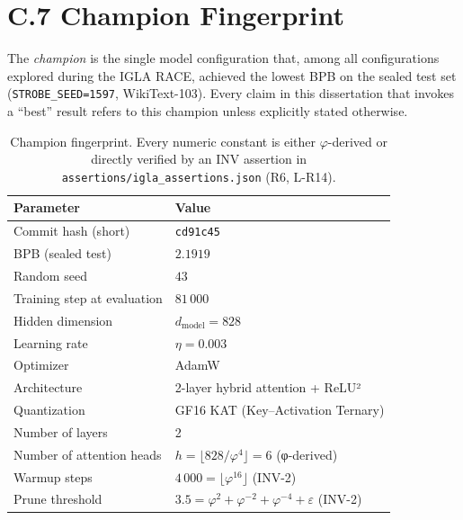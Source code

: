 \section*{C.7 Champion Fingerprint}
\label{sec:champion-fingerprint}

The \emph{champion} is the single model configuration that, among all
configurations explored during the IGLA RACE, achieved the lowest
BPB on the sealed test set (\texttt{STROBE\_SEED=1597}, WikiText-103).
Every claim in this dissertation that invokes a ``best'' result refers
to this champion unless explicitly stated otherwise.

\begin{table}[h]
\centering
\begin{tabular}{ll}
\toprule
\textbf{Parameter} & \textbf{Value} \\
\midrule
Commit hash (short)        & \texttt{cd91c45} \\
BPB (sealed test)          & $2.1919$ \\
Random seed                & $43$ \\
Training step at evaluation& $81\,000$ \\
Hidden dimension           & $d_\text{model} = 828$ \\
Learning rate              & $\eta = 0.003$ \\
Optimizer                  & AdamW \\
Architecture               & 2-layer hybrid attention + ReLU² \\
Quantization               & GF16 KAT (Key–Activation Ternary) \\
Number of layers           & 2 \\
Number of attention heads  & $h = \lfloor 828 / \varphi^4 \rfloor = 6$
                             (φ-derived) \\
Warmup steps               & $4\,000 = \lfloor \varphi^{16} \rfloor$
                             (INV-2) \\
Prune threshold            & $3.5 = \varphi^2 + \varphi^{-2} +
                             \varphi^{-4} + \varepsilon$ (INV-2) \\
\bottomrule
\end{tabular}
\caption{Champion fingerprint.  Every numeric constant is either
$\varphi$-derived or directly verified by an INV assertion in
\texttt{assertions/igla\_assertions.json} (R6, L-R14).}
\end{table}

